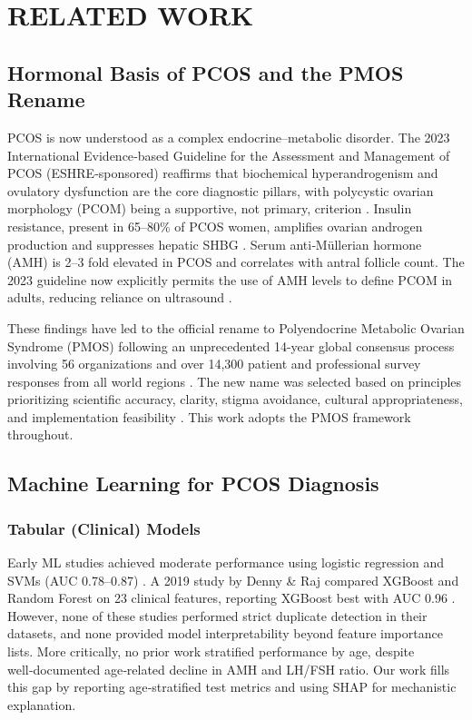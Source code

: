 \documentclass[conference]{IEEEtran}
\begin{document}
\section{RELATED WORK}

\subsection{Hormonal Basis of PCOS and the PMOS Rename}

PCOS is now understood as a complex endocrine–metabolic disorder. The 2023 International Evidence‑based Guideline for the Assessment and Management of PCOS (ESHRE‑sponsored) reaffirms that biochemical hyperandrogenism and ovulatory dysfunction are the core diagnostic pillars, with polycystic ovarian morphology (PCOM) being a supportive, not primary, criterion \cite{ESHRE2023}. Insulin resistance, present in 65–80\% of PCOS women, amplifies ovarian androgen production and suppresses hepatic SHBG \cite{Dunaif1997}. Serum anti‑Müllerian hormone (AMH) is 2–3 fold elevated in PCOS and correlates with antral follicle count. The 2023 guideline now explicitly permits the use of AMH levels to define PCOM in adults, reducing reliance on ultrasound \cite{ESHRE2023}.

These findings have led to the official rename to Polyendocrine Metabolic Ovarian Syndrome (PMOS) following an unprecedented 14-year global consensus process involving 56 organizations and over 14,300 patient and professional survey responses from all world regions \cite{TeedeLancet2026}. The new name was selected based on principles prioritizing scientific accuracy, clarity, stigma avoidance, cultural appropriateness, and implementation feasibility \cite{ContemporaryOBGYN2026}. This work adopts the PMOS framework throughout.

\subsection{Machine Learning for PCOS Diagnosis}

\subsubsection{Tabular (Clinical) Models}
Early ML studies achieved moderate performance using logistic regression and SVMs (AUC 0.78–0.87) \cite{Bharati2020}. A 2019 study by Denny \& Raj compared XGBoost and Random Forest on 23 clinical features, reporting XGBoost best with AUC 0.96 \cite{Denny2019}. However, none of these studies performed strict duplicate detection in their datasets, and none provided model interpretability beyond feature importance lists. More critically, no prior work stratified performance by age, despite well‑documented age‑related decline in AMH and LH/FSH ratio. Our work fills this gap by reporting age‑stratified test metrics and using SHAP for mechanistic explanation.\\
\end{document}
